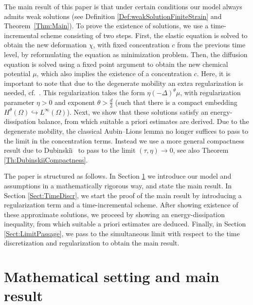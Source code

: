 \documentclass[a4paper,12pt]{article}
\theoremstyle{plain}
\theoremstyle{definition}
\numberwithin{equation}{section}
\begin{document}
The main result of this paper is that under certain conditions our model always admits weak solutions 
(see Definition \ref{Def:weakSolutionFiniteStrain} and Theorem~\ref{Thm:Main}). 
To prove the existence of solutions, we use a time-incremental scheme consisting of two steps. 
First, the elastic equation is solved to obtain the new deformation $\chi$, with fixed concentration $c$ from the previous time level, by reformulating the equation as minimization problem. 
Then, the diffusion equation is solved using a fixed point argument to obtain the new chemical potential $\mu$, which also implies the existence of a concentration $c$. Here, it is important to note that due to the degenerate mobility an extra regularization is needed, cf.\ \cite{Jung2015BbEMfCDS}. This regularization takes the form $\eta(-\Delta)^\theta \mu$, with regularization parameter $\eta>0$ and exponent $\theta > \frac{d}{2}$ (such that there is a compact embedding $H^\theta(\Omega)\hookrightarrow L^\infty(\Omega)$).
Next, we show that these solutions satisfy an energy-dissipation balance, from which suitable a priori estimates are derived. Due to the degenerate mobility, the classical Aubin--Lions lemma no longer suffices to pass to the limit in the concentration terms. Instead we use a more general compactness result due to Dubinski\u\i\ \cite{Dubi1965WCfNEaPE} to pass to the limit $(\tau,\eta)\to0$, see also Theorem \ref{Th:DubinskiiCompactness}.

The paper is structured as follows. In Section \ref{Sect:Setting} we introduce our model and assumptions in a mathematically rigorous way, and state the main result. In Section \ref{Sect:TimeDiscr}, we start the proof of the main result by introducing a regularization term and a time-incremental scheme. After showing existence of these approximate solutions, we proceed by showing an energy-dissipation inequality, from which suitable a priori estimates are deduced. Finally, in Section \ref{Sect:LimitPassage}, we pass to the simultaneous limit with respect to the time discretization and regularization to obtain the main result.




\section{Mathematical setting and main result}
\label{Sect:Setting}
\end{document}
